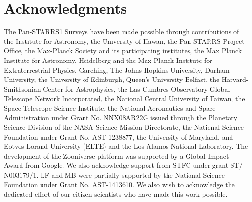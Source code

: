 \documentclass[a4paper,fleqn,usenatbib]{mnras}
\begin{document}
\section*{Acknowledgments}
The Pan-STARRS1 Surveys have been made possible through contributions of the Institute for Astronomy, the University of Hawaii, the Pan-STARRS Project Office, the Max-Planck Society and its participating institutes, the Max Planck Institute for Astronomy, Heidelberg and the Max Planck Institute for Extraterrestrial Physics, Garching, The Johns Hopkins University, Durham University, the University of Edinburgh, Queen's University Belfast, the Harvard-Smithsonian Center for Astrophysics, the Las Cumbres Observatory Global Telescope Network Incorporated, the National Central University of Taiwan, the Space Telescope Science Institute, the National Aeronautics and Space Administration under Grant No. NNX08AR22G issued through the Planetary Science Division of the NASA Science Mission Directorate, the National Science Foundation under Grant No. AST-1238877, the University of Maryland, and Eotvos Lorand University (ELTE) and the Los Alamos National Laboratory.  The development of the Zooniverse platform was supported by a Global Impact Award from Google.  We also acknowledge support from STFC under grant ST$/$N003179$/$1.  LF and MB were partially supported by the National Science Foundation under Grant No. AST-1413610.  We also wish to acknowledge the dedicated effort of our citizen scientists who have made this work possible.

\bsp	%
\label{lastpage}
\end{document}
